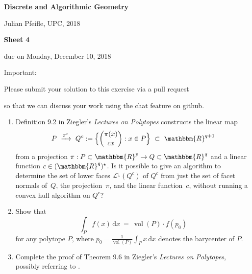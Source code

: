 \documentclass[11pt]{amsart}
\DeclareMathOperator{\vol}{vol}
\newcommand{\RR}{\mathbbm{R}}
\begin{document}
\begin{center}
\textbf{\sffamily
   Discrete and Algorithmic Geometry }

\medskip
   Julian Pfeifle,
   UPC, 2018
\end{center}


\begin{center}
  \textbf{\sffamily Sheet 4}

\bigskip
 due on Monday, December 10, 2018

 \bfseries

\bigskip
\bigskip
\bigskip


Important:

\bigskip
Please submit your solution to this exercise via a pull request

so that we can discuss your work using the chat feature on github.

\end{center}

\bigskip
\bigskip
\bigskip

\begin{enumerate}
\item Definition 9.2 in Ziegler's \emph{Lectures on Polytopes} constructs the linear map
  \[
    P
    \ \xrightarrow{\pi^c}\ 
    Q^c :=
    \Big\{ \binom{\pi(x)}{cx} : x\in P\Big\}
    \ \subset \
    \RR^{q+1}
  \]
  from a projection $\pi:P\subset\RR^p\to Q\subset\RR^q$ and a linear function $c\in(\RR^q)^\star$.
  Is it possible to give an algorithm to determine the set of lower faces $\mathcal L^\downarrow(Q^c)$ of $Q^c$ from just the set of facet normals of~$Q$, the projection~$\pi$, and the linear function~$c$, without running a convex hull algorithm on $Q^c$?

  \bigskip\bigskip
\item Show that
  \[
    \int_P f(x)\,\text{d}x
    \ = \
    \vol(P) \cdot f(p_0)
  \]
  for any polytope $P$, where $p_0 = \frac{1}{\vol(P)}\int_P x\,\text{d}x$ denotes the barycenter of $P$.
  \bigskip\bigskip
\item Complete the proof of Theorem 9.6 in Ziegler's \emph{Lectures on Polytopes}, possibly referring to \cite{bs-1992}.
  
\end{enumerate}



\end{document}
